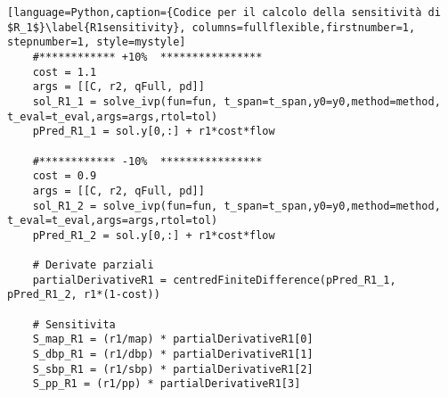 \begin{lstlisting}[language=Python,caption={Codice per il calcolo della sensitività di $R_1$}\label{R1sensitivity}, columns=fullflexible,firstnumber=1, stepnumber=1, style=mystyle]
    #************ +10%  ****************
    cost = 1.1
    args = [[C, r2, qFull, pd]]
    sol_R1_1 = solve_ivp(fun=fun, t_span=t_span,y0=y0,method=method, t_eval=t_eval,args=args,rtol=tol)
    pPred_R1_1 = sol.y[0,:] + r1*cost*flow
    
    #************ -10%  ****************
    cost = 0.9
    args = [[C, r2, qFull, pd]]
    sol_R1_2 = solve_ivp(fun=fun, t_span=t_span,y0=y0,method=method, t_eval=t_eval,args=args,rtol=tol)
    pPred_R1_2 = sol.y[0,:] + r1*cost*flow
    
    # Derivate parziali
    partialDerivativeR1 = centredFiniteDifference(pPred_R1_1, pPred_R1_2, r1*(1-cost))
    
    # Sensitivita
    S_map_R1 = (r1/map) * partialDerivativeR1[0]
    S_dbp_R1 = (r1/dbp) * partialDerivativeR1[1]
    S_sbp_R1 = (r1/sbp) * partialDerivativeR1[2]
    S_pp_R1 = (r1/pp) * partialDerivativeR1[3]
\end{lstlisting}